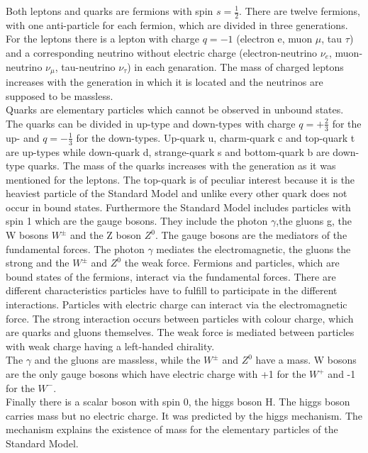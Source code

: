 Both leptons and quarks are fermions with spin $s= \frac{1}{2}$. 
There are twelve fermions, with one anti-particle for each fermion, which are divided in three generations.     
For the leptons there is a lepton with charge $q = -1$ (electron e, muon $\mu$, tau $\tau$) and a corresponding neutrino without electric charge (electron-neutrino $\nu_{e}$, muon-neutrino $\nu_{\mu}$, tau-neutrino $\nu_{\tau}$) in each genaration.
The mass of charged leptons increases with the generation in which it is located and the neutrinos are supposed to be massless.\\
Quarks are elementary particles which cannot be observed in unbound states.
The quarks can be divided in up-type and down-types with charge $q = +\frac{2}{3}$ for the up- and $q = -\frac{1}{3}$ for the down-types.
Up-quark u, charm-quark c and top-quark t are up-types while down-quark d, strange-quark s and bottom-quark b are down-type quarks. 
The mass of the quarks increases with the generation as it was mentioned for the leptons.
The top-quark is of peculiar interest because it is the heaviest particle of the Standard Model and unlike every other quark does not occur in bound states.
Furthermore the Standard Model includes particles with spin 1 which are the gauge bosons.
They include the photon $\gamma$,the gluons g, the W bosons $W^{\pm}$ and the Z boson $Z^{0}$.
The gauge bosons are the mediators of the fundamental forces. 
The photon $\gamma$ mediates the electromagnetic, the gluons the strong  and the $W^{\pm}$ and $Z^{0}$ the weak force.  
Fermions and particles, which are bound states of the fermions, interact via the fundamental forces.
There are different characteristics particles have to fulfill to participate in the different interactions.
Particles with electric charge can interact via the electromagnetic force.
The strong interaction occurs between particles with colour charge, which are quarks and gluons themselves.
The weak force is mediated between particles with weak charge having a left-handed chirality.\\
The $\gamma$ and the gluons are massless, while the $W^{\pm}$ and $Z^{0}$ have a mass. 
W bosons are the only gauge bosons which have electric charge with +1 for the $W^{+}$ and -1 for the $W^{-}$.\\
Finally there is a scalar boson with spin 0, the higgs boson H.
The higgs boson carries mass but no electric charge.
It was predicted  by the higgs mechanism.
The mechanism explains the existence of mass for the elementary particles of the Standard Model.




